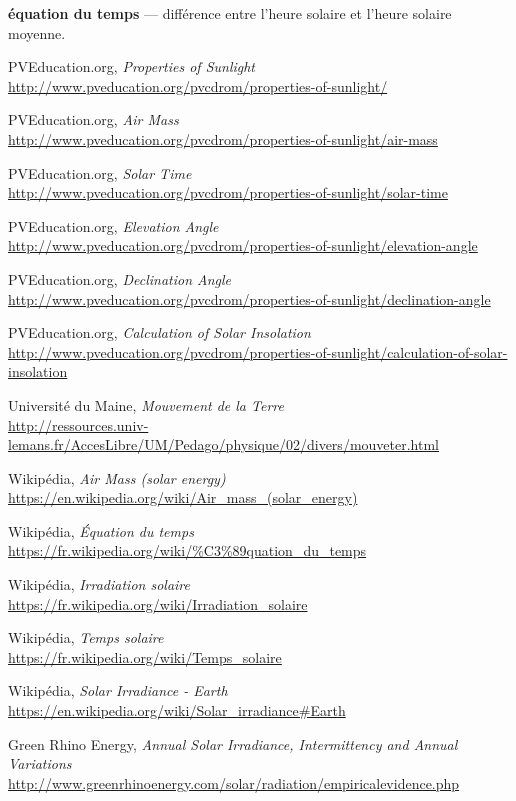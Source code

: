 \documentclass[12pt]{article}
\begin{document}
\textbf{équation du temps} --- différence entre l'heure solaire et l'heure solaire moyenne.


\clearpage
\begin{thebibliography}{99}

	PVEducation.org,
	\emph{Properties of Sunlight}\\
	\url{http://www.pveducation.org/pvcdrom/properties-of-sunlight/}

	PVEducation.org,
	\emph{Air Mass}\\
	\url{http://www.pveducation.org/pvcdrom/properties-of-sunlight/air-mass}

	PVEducation.org,
	\emph{Solar Time}\\
	\url{http://www.pveducation.org/pvcdrom/properties-of-sunlight/solar-time}

	PVEducation.org,
	\emph{Elevation Angle}\\
	\url{http://www.pveducation.org/pvcdrom/properties-of-sunlight/elevation-angle}

	PVEducation.org,
	\emph{Declination Angle}\\
	\url{http://www.pveducation.org/pvcdrom/properties-of-sunlight/declination-angle}

	PVEducation.org,
	\emph{Calculation of Solar Insolation}\\
	\url{http://www.pveducation.org/pvcdrom/properties-of-sunlight/calculation-of-solar-insolation}

	Université du Maine,
	\emph{Mouvement de la Terre}\\
	\url{http://ressources.univ-lemans.fr/AccesLibre/UM/Pedago/physique/02/divers/mouveter.html}

	Wikipédia,
	\emph{Air Mass (solar energy)}\\
	\url{https://en.wikipedia.org/wiki/Air_mass_(solar_energy)}

	Wikipédia,
	\emph{Équation du temps}\\
	\url{https://fr.wikipedia.org/wiki/%C3%89quation_du_temps}
	
	Wikipédia,
	\emph{Irradiation solaire}\\
	\url{https://fr.wikipedia.org/wiki/Irradiation_solaire}
	
	Wikipédia,
	\emph{Temps solaire}\\
	\url{https://fr.wikipedia.org/wiki/Temps_solaire}
	
	Wikipédia,
	\emph{Solar Irradiance - Earth}\\
	\url{https://en.wikipedia.org/wiki/Solar_irradiance#Earth}
	
	Green Rhino Energy,
	\emph{Annual Solar Irradiance, Intermittency and Annual Variations}\\
	\url{http://www.greenrhinoenergy.com/solar/radiation/empiricalevidence.php}

\end{thebibliography}
\end{document}
